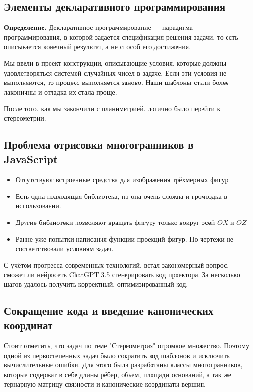 \documentclass[a4paper, 12pt]{extarticle}
\begin{document}
\subsection*{Элементы декларативного программирования}

\textbf{Определение.} Декларативное программирование — парадигма программирования, в которой задается спецификация решения задачи, то есть описывается конечный результат, а не способ его достижения.~\cite{posobie}

Мы ввели в проект конструкции, описывающие условия, которые должны удовлетворяться системой случайных чисел в задаче. Если эти условия не выполняются, то процесс выполняется заново. Наши шаблоны стали более лаконичны и отладка их стала проще.

После того, как мы закончили с планиметрией, логично было перейти к стереометрии.

\subsection*{Проблема отрисовки многогранников в JavaScript}

\begin{itemize}
	\item Отсутствуют встроенные средства для изображения трёхмерных фигур
	\item Есть одна подходящая библиотека, но она очень сложна и громоздка в использовании.
	\item Другие библиотеки позволяют вращать фигуру только вокруг осей $OX$ и $OZ$
	\item Ранне уже попытки написания функции проекций фигур. Но чертежи не соответствовали условиям задач.
\end{itemize}

С учётом прогресса современных технологий, встал закономерный вопрос, сможет ли нейросеть ChatGPT 3.5 сгенерировать код проектора.
За несколько шагов удалось получить корректный, оптимизированный код.

\subsection*{Сокращение кода и введение канонических координат}

Стоит отметить, что задач по теме "Стереометрия" огромное множество. Поэтому одной из первостепенных задач было сократить код шаблонов и исключить вычислительные ошибки. Для этого были разработаны классы многогранников, которые содержат в себе длины рёбер, объем, площади оснований, а так же тернарную матрицу связности и канонические координаты вершин.
\end{document}
